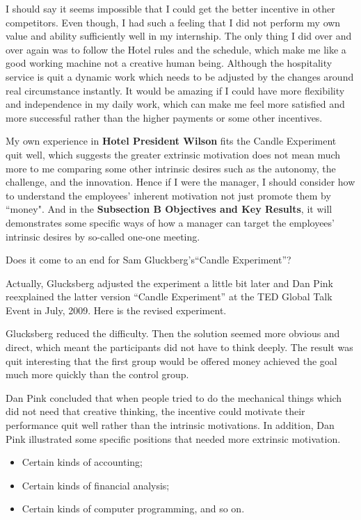 \documentclass[12pt,onecolumn,a4paper]{IEEEtran}
\begin{document}
I should say it seems impossible that I could get the better incentive in other competitors. Even though, I had such a feeling that I did not perform my own value and ability sufficiently well in my internship. The only thing I did over and over again was to follow the Hotel rules and the schedule, which make me like a good working machine not a creative human being. Although the hospitality service is quit a dynamic work which needs to be adjusted by the changes around real circumstance instantly. It would be amazing if I could have more flexibility and independence in my daily work, which can make me feel more satisfied and more successful rather than the higher payments or some other incentives. 

My own experience in \textbf{Hotel President Wilson} fits the Candle Experiment quit well, which suggests the greater extrinsic motivation does not mean much more to me comparing some other intrinsic desires such as the autonomy, the challenge, and the innovation. Hence if I were the manager, I should consider how to understand the employees' inherent motivation not just promote them by ``money". And in the \textbf{Subsection B Objectives and Key Results}, it will demonstrates some specific ways of how a manager can target the employees' intrinsic desires by so-called one-one meeting.

Does it come to an end for Sam Gluckberg's``Candle Experiment''? 

Actually, Glucksberg adjusted the experiment a little bit later and Dan Pink reexplained the latter version ``Candle Experiment'' at the TED Global Talk Event in July, 2009\cite{DanPink}. Here is the revised experiment.

Glucksberg reduced the difficulty. Then the solution seemed more obvious and direct, which meant the participants did not have to think deeply. The result was quit interesting that the first group would be offered money achieved the goal much more quickly than the control group.

Dan Pink\cite{DanPink} concluded that when people tried to do the mechanical things which did not need that creative thinking, the incentive could motivate their performance quit well rather than the intrinsic motivations. In addition, Dan Pink illustrated some specific positions\cite{DanPink} that needed more extrinsic motivation.

\begin{itemize}
  \item Certain kinds of accounting;
  \item Certain kinds of financial analysis;
  \item Certain kinds of computer programming, and so on.
\end{itemize}
\end{document}
